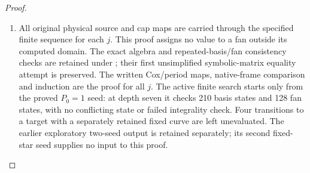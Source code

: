 \begin{proof}
\begin{enumerate}[label=\arabic*.]
\item All original physical source and cap maps are carried through
the specified finite sequence for each \(j\). This proof assigns
no value to a fan outside its computed domain. The exact algebra
and repeated-basis/fan consistency checks are retained under
; their
first unsimplified symbolic-matrix equality attempt is preserved.
The written Cox/period maps, native-frame comparison and induction
are the proof for all \(j\). The active finite search starts only
from the proved \(P_0=1\) seed: at depth seven it checks
210 basis states and 128 fan states, with no conflicting state
or failed integrality check. Four transitions to a target with
a separately retained fixed curve are left unevaluated.
The earlier exploratory two-seed output is retained separately;
its second fixed-star seed supplies no input to this proof.

\end{enumerate}
\end{proof}